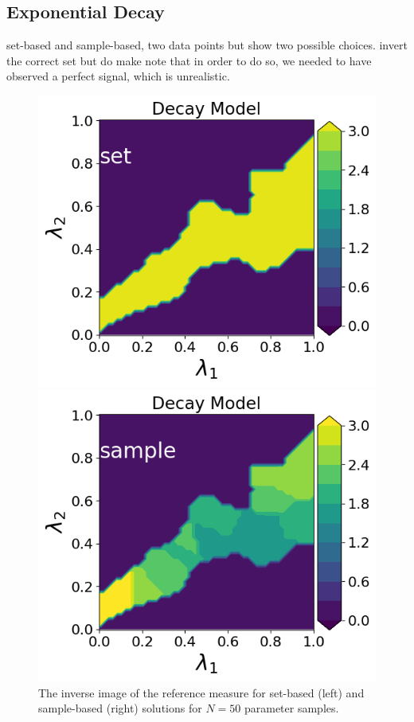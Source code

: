 \subsection{Exponential Decay}\label{ex:decay-set-sample}

set-based and sample-based, two data points but show two possible choices.
invert the correct set but do make note that in order to do so, we needed to have observed a perfect signal, which is unrealistic.


\begin{figure}[h]
\begin{minipage}{.475\textwidth}
\includegraphics[width=\linewidth]{examples/fig_decay_q1/DecayModel--set_N50_em.png}
\end{minipage}
\begin{minipage}{.475\textwidth}
\includegraphics[width=\linewidth]{examples/fig_decay_q1/DecayModel--sample_N50_mc.png}
\end{minipage}
\caption{The inverse image of the reference measure for set-based (left) and sample-based (right) solutions for $N=50$ parameter samples.}
\label{fig:heatrod-sol-ex}
\end{figure}

